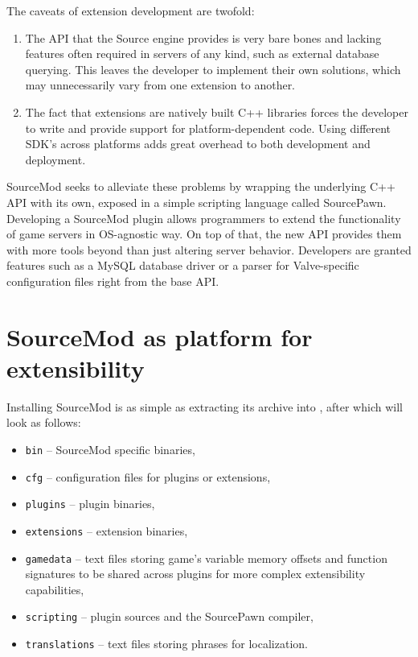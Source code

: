 The caveats of extension development are twofold:
\begin{enumerate}
\item
The API that the Source engine provides is very bare bones and lacking features often required in servers of any kind, such as external database querying.
This leaves the developer to implement their own solutions, which may unnecessarily vary from one extension to another.
\item
The fact that extensions are natively built C++ libraries forces the developer to write and provide support for platform-dependent code.
Using different SDK's across platforms adds great overhead to both development and deployment.
\end{enumerate}
SourceMod seeks to alleviate these problems by wrapping the underlying C++ API with its own, exposed in a simple scripting language called SourcePawn.
Developing a SourceMod plugin allows programmers to extend the functionality of game servers in OS-agnostic way.
On top of that, the new API provides them with more tools beyond than just altering server behavior.
Developers are granted features such as a MySQL database driver or a parser for Valve-specific configuration files right from the base API.

\section{SourceMod as platform for extensibility}

Installing SourceMod is as simple as extracting its archive into , after which  will look as follows:
\begin{itemize}
    \item \verb|bin| -- SourceMod specific binaries,
    \item \verb|cfg| -- configuration files for plugins or extensions,
    \item \verb|plugins| -- plugin binaries,
    \item \verb|extensions| -- extension binaries,
    \item \verb|gamedata| -- text files storing game's variable memory offsets and function signatures to be shared across plugins for more complex extensibility capabilities,
    \item \verb|scripting| -- plugin sources and the SourcePawn compiler,
    \item \verb|translations| -- text files storing phrases for localization.
\end{itemize}

